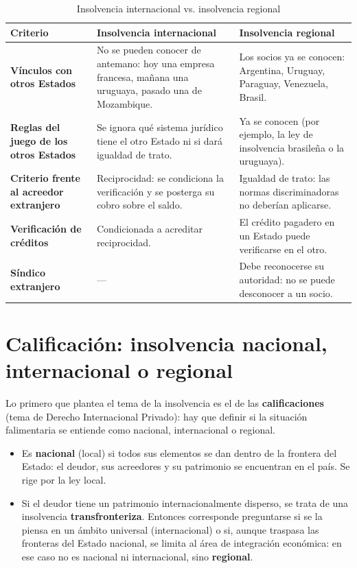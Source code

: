 \documentclass[12pt,oneside]{book}
\begin{document}
\begin{table}[H]
\centering
\caption{Insolvencia internacional vs. insolvencia regional}
\begin{tabularx}{\textwidth}{>{\raggedright\arraybackslash}p{} >{\raggedright\arraybackslash}X >{\raggedright\arraybackslash}X}
\toprule
\textbf{Criterio} & \textbf{Insolvencia internacional} & \textbf{Insolvencia regional} \\
\midrule
\textbf{Vínculos con otros Estados} & No se pueden conocer de antemano: hoy una empresa francesa, mañana una uruguaya, pasado una de Mozambique. & Los socios ya se conocen: Argentina, Uruguay, Paraguay, Venezuela, Brasil. \\
\textbf{Reglas del juego de los otros Estados} & Se ignora qué sistema jurídico tiene el otro Estado ni si dará igualdad de trato. & Ya se conocen (por ejemplo, la ley de insolvencia brasileña o la uruguaya). \\
\textbf{Criterio frente al acreedor extranjero} & Reciprocidad: se condiciona la verificación y se posterga su cobro sobre el saldo. & Igualdad de trato: las normas discriminadoras no deberían aplicarse. \\
\textbf{Verificación de créditos} & Condicionada a acreditar reciprocidad. & El crédito pagadero en un Estado puede verificarse en el otro. \\
\textbf{Síndico extranjero} & --- & Debe reconocerse su autoridad: no se puede desconocer a un socio. \\
\bottomrule
\end{tabularx}
\end{table}

\section{Calificación: insolvencia nacional, internacional o regional}

Lo primero que plantea el tema de la insolvencia es el de las \textbf{calificaciones} (tema de Derecho Internacional Privado): hay que definir si la situación falimentaria se entiende como nacional, internacional o regional.

\begin{itemize}
    \item Es \textbf{nacional} (local) si todos sus elementos se dan dentro de la frontera del Estado: el deudor, sus acreedores y su patrimonio se encuentran en el país. Se rige por la ley local.
    \item Si el deudor tiene un patrimonio internacionalmente disperso, se trata de una insolvencia \textbf{transfronteriza}. Entonces corresponde preguntarse si se la piensa en un ámbito universal (internacional) o si, aunque traspasa las fronteras del Estado nacional, se limita al área de integración económica: en ese caso no es nacional ni internacional, sino \textbf{regional}.
\end{itemize}
\end{document}
